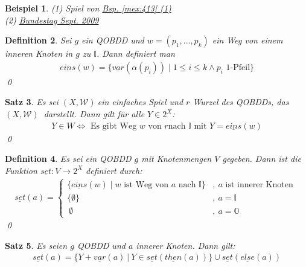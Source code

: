\documentclass[ngerman]{scrartcl}
\theoremstyle{custom}
\newtheorem{mdef}{Definition} \numberwithin{mdef}{subsection}
\newtheorem{mex}[mdef]{Beispiel}
\newtheorem{ms}[mdef]{Satz}
\newcommand{\0}{\mathbf{0}}
\newcommand{\1}{\mathbf{L}}
\newcommand{\then}{\underline{then}}
\newcommand{\el}{\underline{else}}
\newcommand{\var}{\underline{var}}
\newcommand{\eins}{\underline{eins}}
\newcommand{\set}{\underline{set}}
\newcommand{\sg}{$(X,\mathcal{W})~$}
\begin{document}
\begin{mex}
(1) Spiel von \hyperref[mex:413]{Bsp. \ref{mex:413} (1)}\\
(2) \hyperref[mex:413]{Bundestag Sept. 2009}
\end{mex}

\begin{mdef}
Sei $g$ ein QOBDD und $w = (p_1, \dots, p_k)$ ein Weg von einem
inneren Knoten in $g$ zu $\mathds{I}$. Dann definiert man
\begin{align*}
\underline{eins}(w) = \{\var(\alpha(p_i)) \mid 1 \leq i \leq k \wedge
p_i \text{ 1-Pfeil}\}
\end{align*}
\qed
\end{mdef}

\begin{ms}
Es sei \sg ein einfaches Spiel und $r$ Wurzel des QOBDDs, das \sg
darstellt. Dann gilt f\"ur alle $Y \in 2^X$:
\begin{align*}
Y \in W \Leftrightarrow \text{ Es gibt Weg } w \text{ von } r \text{
  nach } \mathds{I} \text{ mit } Y = \underline{eins}(w)
\end{align*}
\qed
\end{ms}

\begin{mdef}
Es sei ein QOBDD $g$ mit Knotenmengen $V$ gegeben. Dann ist die
Funktion $\underline{set}:V \rightarrow 2^X$ definiert durch:
\begin{align*}
  \set(a) = \begin{cases} \{\eins(w) \mid w \text{ ist Weg von } a
    \text{ nach } \mathds{I} \} &,~ a \text{ ist innerer Knoten }\\
    \{\emptyset\} &,~ a = \mathds{I}\\
    ~\emptyset &,~ a = \mathds{O}
  \end{cases}
\end{align*}
\qed
\end{mdef}

\begin{ms}
Es seien $g$ QOBDD und $a$ innerer Knoten. Dann gilt:
\begin{align*}
\set(a) = \{Y+\var(a) ~\vert~ Y \in \set(\then(a))\} \cup \set(\el(a))
\end{align*}
\end{ms}
\end{document}
